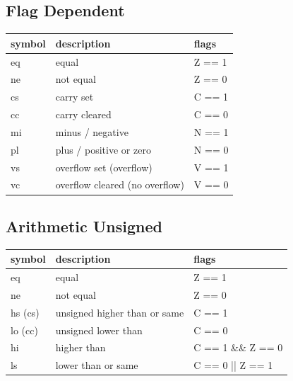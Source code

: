 \documentclass
[
    10pt,
    a4paper,
]
{article}
\begin{document}
\subsection{Flag Dependent}
{\normalsize
\begin{tabular}
{ | p{} | p{} | p{} | }
    \hline
    \textbf{symbol} & \textbf{description} & \textbf{flags}\\
    \hline
    \hline
    eq      & equal                             & Z == 1\\
    \hline
    ne      & not equal                         & Z == 0\\
    \hline
    cs      & carry set                         & C == 1\\
    \hline
    cc      & carry cleared                     & C == 0\\
    \hline
    mi      & minus / negative                  & N == 1\\
    \hline
    pl      & plus / positive or zero           & N == 0\\
    \hline
    vs      & overflow set (overflow)           & V == 1\\
    \hline
    vc      & overflow cleared (no overflow)    & V == 0\\
    \hline
\end{tabular}
}

\subsection{Arithmetic Unsigned}
{\normalsize
\begin{tabular}
{ | p{} | p{} | p{} | }
    \hline
    \textbf{symbol} & \textbf{description} & \textbf{flags}\\
    \hline
    \hline
    eq      & equal                             & Z == 1\\
    \hline
    ne      & not equal                         & Z == 0\\
    \hline
    hs (cs) & unsigned higher than or same      & C == 1\\
    \hline
    lo (cc) & unsigned lower than               & C == 0\\
    \hline
    hi      & higher than                       & C == 1 \&\& Z == 0\\
    \hline
    ls      & lower than or same                & C == 0 ||   Z == 1\\
    \hline
\end{tabular}
}
\end{document}
